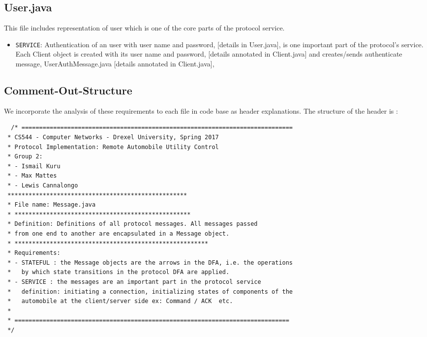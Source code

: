 \documentclass[12pt]{usenixsubmit}
\newlength\someheight
\begin{document}
  \subsection{User.java} This file includes representation of user which is one of the core parts of the protocol service. 
  \begin{itemize}
  \item {\tt SERVICE}: Authentication of an user with user name and password, [details in User.java],  is one important part of the protocol's service. Each Client object is created with its user name and password, [details annotated in Client.java] and creates/sends authenticate message, UserAuthMessage.java [details annotated in Client.java], 
    \end{itemize}
\begin{appendices}

\section{Comment-Out-Structure}
  We incorporate the analysis of these requirements to each file in code base as header explanations. The structure of the header is :

    \begin{adjustbox}{width=\textwidth,height=\someheight,keepaspectratio}
    \begin{lstlisting}
  /* =============================================================================
 * CS544 - Computer Networks - Drexel University, Spring 2017
 * Protocol Implementation: Remote Automobile Utility Control
 * Group 2:
 * - Ismail Kuru
 * - Max Mattes
 * - Lewis Cannalongo
 ***************************************************
 * File name: Message.java
 * **************************************************
 * Definition: Definitions of all protocol messages. All messages passed
 * from one end to another are encapsulated in a Message object.
 * *******************************************************
 * Requirements:
 * - STATEFUL : the Message objects are the arrows in the DFA, i.e. the operations
 *   by which state transitions in the protocol DFA are applied.
 * - SERVICE : the messages are an important part in the protocol service
 *   definition: initiating a connection, initializing states of components of the
 *   automobile at the client/server side ex: Command / ACK  etc.
 * 
 * ==============================================================================
 */      
    \end{lstlisting}
    \end{adjustbox}




\end{appendices}
\end{document}
